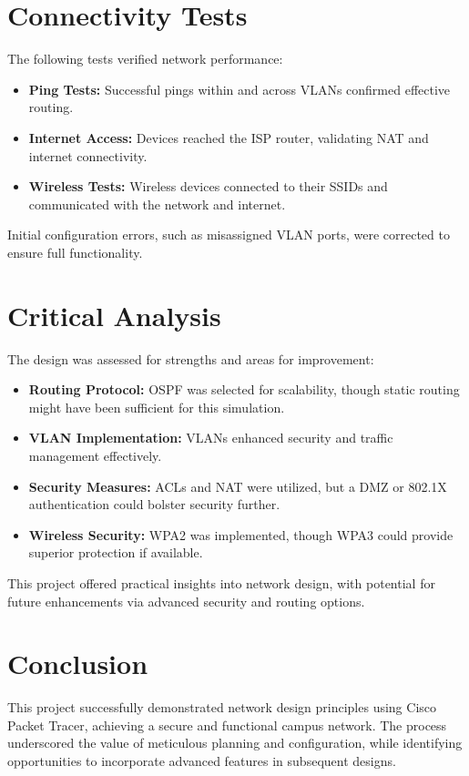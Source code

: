 \documentclass{article}
\begin{document}
\section{Connectivity Tests}
The following tests verified network performance:
\begin{itemize}
	\item \textbf{Ping Tests:} Successful pings within and across VLANs confirmed effective routing.
	\item \textbf{Internet Access:} Devices reached the ISP router, validating NAT and internet connectivity.
	\item \textbf{Wireless Tests:} Wireless devices connected to their SSIDs and communicated with the network and internet.
\end{itemize}
Initial configuration errors, such as misassigned VLAN ports, were corrected to ensure full functionality.

\section{Critical Analysis}
The design was assessed for strengths and areas for improvement:
\begin{itemize}
	\item \textbf{Routing Protocol:} OSPF was selected for scalability, though static routing might have been sufficient for this simulation.
	\item \textbf{VLAN Implementation:} VLANs enhanced security and traffic management effectively.
	\item \textbf{Security Measures:} ACLs and NAT were utilized, but a DMZ or 802.1X authentication could bolster security further.
	\item \textbf{Wireless Security:} WPA2 was implemented, though WPA3 could provide superior protection if available.
\end{itemize}
This project offered practical insights into network design, with potential for future enhancements via advanced security and routing options.

\section{Conclusion}
This project successfully demonstrated network design principles using Cisco Packet Tracer, achieving a secure and functional campus network. The process underscored the value of meticulous planning and configuration, while identifying opportunities to incorporate advanced features in subsequent designs.
\end{document}
